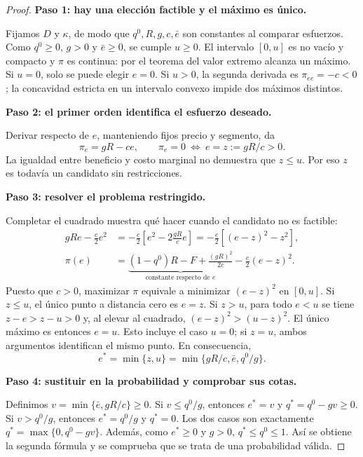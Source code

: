 \documentclass[11pt]{article}
\theoremstyle{definition}\newtheorem{assumption}{Supuesto}
\begin{document}
\begin{proof}
\textbf{Paso 1: hay una elección factible y el máximo es único.}\par
Fijamos $D$ y $\kappa$, de modo que $q^0,R,g,c,\bar e$ son constantes al
comparar esfuerzos. Como $q^0\ge0$, $g>0$ y $\bar e\ge0$, se cumple $u\ge0$.
El intervalo $[0,u]$ es no vacío y compacto y $\pi$ es continua: por el teorema
del valor extremo alcanza un máximo. Si $u=0$, solo se puede elegir $e=0$.
Si $u>0$, la segunda derivada es $\pi_{ee}=-c<0$; la concavidad estricta en
un intervalo convexo impide dos máximos distintos.

\textbf{Paso 2: el primer orden identifica el esfuerzo deseado.}\par
Derivar respecto de $e$, manteniendo fijos precio y segmento, da
\[
\pi_e=gR-ce,\qquad \pi_e=0\ \Longleftrightarrow\ e=z:=gR/c>0.
\]
La igualdad entre beneficio y costo marginal no demuestra que $z\le u$.
Por eso $z$ es todavía un candidato sin restricciones.

\textbf{Paso 3: resolver el problema restringido.}\par
Completar el cuadrado muestra qué hacer cuando el candidato no es factible:
\begin{align*}
gRe-\frac c2e^2
 &=-\frac c2\left[e^2-2\frac{gR}{c}e\right]
  =-\frac c2\left[(e-z)^2-z^2\right],\\
\pi(e)&=\underbrace{(1-q^0)R-F+\frac{(gR)^2}{2c}}_{\text{constante respecto de }e}
              -\frac c2(e-z)^2.
\end{align*}
Puesto que $c>0$, maximizar $\pi$ equivale a minimizar $(e-z)^2$ en $[0,u]$.
Si $z\le u$, el único punto a distancia cero es $e=z$. Si $z>u$, para todo
$e<u$ se tiene $z-e>z-u>0$ y, al elevar al cuadrado,
$(e-z)^2>(u-z)^2$. El único máximo es entonces $e=u$. Esto incluye el caso
$u=0$; si $z=u$, ambos argumentos identifican el mismo punto. En consecuencia,
\[
e^*=\min\{z,u\}=\min\{gR/c,\bar e,q^0/g\}.
\]

\textbf{Paso 4: sustituir en la probabilidad y comprobar sus cotas.}\par
Definimos $v=\min\{\bar e,gR/c\}\ge0$. Si $v\le q^0/g$, entonces $e^*=v$ y
$q^*=q^0-gv\ge0$. Si $v>q^0/g$, entonces $e^*=q^0/g$ y $q^*=0$. Los dos
casos son exactamente $q^*=\max\{0,q^0-gv\}$. Además, como $e^*\ge0$ y
$g>0$, $q^*\le q^0\le1$. Así se obtiene la segunda fórmula y se comprueba
que se trata de una probabilidad válida.


\end{proof}
\end{document}
